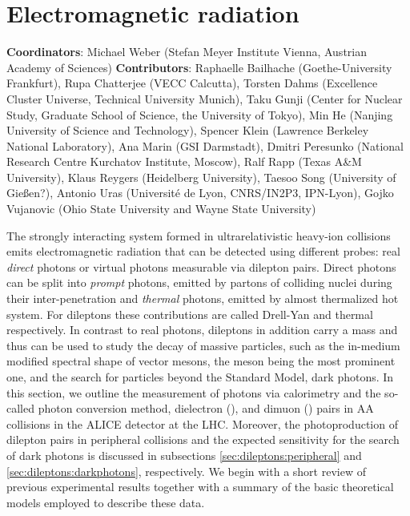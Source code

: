 \documentclass[../report.tex]{subfiles}
\begin{document}
\section{Electromagnetic radiation}
\label{chapter:electromagnetic_radiation}

\textbf{Coordinators}: Michael Weber (Stefan Meyer Institute Vienna, Austrian Academy of Sciences) 
\linebreak
\textbf{Contributors}: 
		Raphaelle Bailhache (Goethe-University Frankfurt), 
        Rupa Chatterjee (VECC Calcutta),
		Torsten Dahms (Excellence Cluster Universe, Technical University Munich), 
		Taku Gunji (Center for Nuclear Study, Graduate School of Science, the University of Tokyo), 
        Min He (Nanjing University of Science and Technology),
        Spencer Klein (Lawrence Berkeley National Laboratory), 
        Ana Marin (GSI Darmstadt), 
        Dmitri Peresunko (National Research Centre Kurchatov Institute, Moscow),  
        Ralf Rapp (Texas A\&M University), 
        Klaus Reygers (Heidelberg University), 
        Taesoo Song (University of Gie{\ss}en?), 
        Antonio Uras (Universit{\'e} de Lyon, CNRS/IN2P3, IPN-Lyon),
        Gojko Vujanovic (Ohio State University and Wayne State University)



The strongly interacting system formed in ultrarelativistic heavy-ion collisions 
emits electromagnetic radiation that can be detected using different probes: real {\it direct} photons %
or virtual photons measurable via dilepton pairs. 
Direct photons can be split into {\it prompt} photons, emitted by partons of colliding nuclei during their inter-penetration and {\it thermal} photons, emitted by almost thermalized hot system. 
For dileptons these contributions are called Drell-Yan and thermal respectively.
In contrast to real photons, dileptons in addition carry a mass and thus can be used to study the decay of massive particles, such as the in-medium modified spectral shape of vector mesons, the \PGr meson being the most prominent one, and the search for particles beyond the Standard Model, \eg dark photons. In this section, we outline the measurement of photons via calorimetry and the so-called photon conversion method, dielectron (\Pepem), and dimuon (\PGmpGmm) pairs in AA collisions in the ALICE detector at the LHC. Moreover, the photoproduction of dilepton pairs in peripheral collisions and the expected sensitivity for the search of dark photons is discussed in subsections \ref{sec:dileptons:peripheral} and \ref{sec:dileptons:darkphotons}, respectively. We begin with a short review of previous experimental results together with a summary of the basic theoretical models employed to describe these data.
\end{document}
